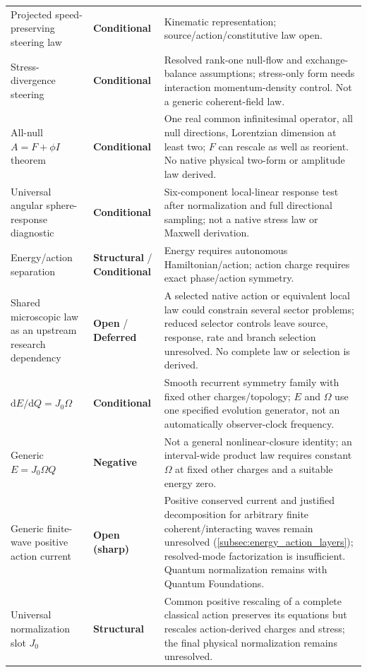 \documentclass[11pt]{article}
\theoremstyle{definition}
\newcommand{\dd}{\mathrm{d}}
\newcommand{\statusStructural}{\textcolor{blue!55!black}{\textbf{Structural}}}
\newcommand{\statusConditional}{\textcolor{yellow!60!black}{\textbf{Conditional}}}
\newcommand{\statusNegative}{\textcolor{red!65!black}{\textbf{Negative}}}
\newcommand{\statusDeferred}{\textcolor{gray!70!black}{\textbf{Deferred}}}
\newcommand{\statusOpen}{\textcolor{red!75!black}{\textbf{Open}}}
\newcommand{\statusSharpOpen}{\textcolor{red!35!black}{\textbf{Open (sharp)}}}
\begin{document}
\begin{longtable}{@{}P{4.9cm}P{3.0cm}P{6.8cm}@{}}
Projected speed-preserving steering law & \statusConditional{} & Kinematic representation; source/action/constitutive law open. \\
Stress-divergence steering & \statusConditional{} & Resolved rank-one null-flow and exchange-balance assumptions; stress-only form needs interaction momentum-density control. Not a generic coherent-field law. \\
All-null $A=F+\phi I$ theorem & \statusConditional{} & One real common infinitesimal operator, all null directions, Lorentzian dimension at least two; $F$ can rescale as well as reorient. No native physical two-form or amplitude law derived. \\
Universal angular sphere-response diagnostic & \statusConditional{} & Six-component local-linear response test after normalization and full directional sampling; not a native stress law or Maxwell derivation. \\
Energy/action separation & \statusStructural{} / \statusConditional{} & Energy requires autonomous Hamiltonian/action; action charge requires exact phase/action symmetry. \\
Shared microscopic law as an upstream research dependency & \statusOpen{} / \statusDeferred{} & A selected native action or equivalent local law could constrain several sector problems; reduced selector controls leave source, response, rate and branch selection unresolved. No complete law or selection is derived. \\
$\dd E/\dd Q=J_0\Omega$ & \statusConditional{} & Smooth recurrent symmetry family with fixed other charges/topology; $E$ and $\Omega$ use one specified evolution generator, not an automatically observer-clock frequency. \\
Generic $E=J_0\Omega Q$ & \statusNegative{} & Not a general nonlinear-closure identity; an interval-wide product law requires constant $\Omega$ at fixed other charges and a suitable energy zero. \\
Generic finite-wave positive action current & \statusSharpOpen{} & Positive conserved current and justified decomposition for arbitrary finite coherent/interacting waves remain unresolved (\cref{subsec:energy_action_layers}); resolved-mode factorization is insufficient. Quantum normalization remains with Quantum Foundations. \\
Universal normalization slot $J_0$ & \statusStructural{} & Common positive rescaling of a complete classical action preserves its equations but rescales action-derived charges and stress; the final physical normalization remains unresolved. \\

\end{longtable}
\end{document}
